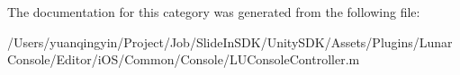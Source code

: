 The documentation for this category was generated from the following file\+:\begin{DoxyCompactItemize}
\item 
/\+Users/yuanqingyin/\+Project/\+Job/\+Slide\+In\+S\+D\+K/\+Unity\+S\+D\+K/\+Assets/\+Plugins/\+Lunar\+Console/\+Editor/i\+O\+S/\+Common/\+Console/L\+U\+Console\+Controller.\+m\end{DoxyCompactItemize}
